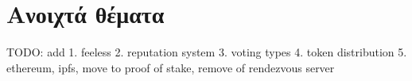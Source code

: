 \section{Ανοιχτά θέματα}

TODO: add
1. feeless
2. reputation system
3. voting types
4. token distribution
5. ethereum, ipfs, move to proof of stake, remove of rendezvous server
